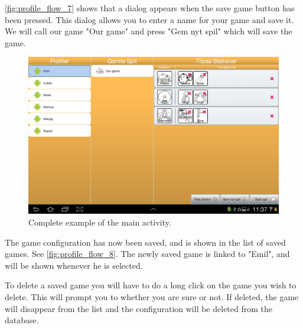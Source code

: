 \autoref{fig:profile_flow_7} shows that a dialog appears when the save game button has been pressed. This dialog allows you to enter a name for your game and save it. We will call our game "Our game" and press "Gem nyt spil" which will save the game.

\begin{figure}[H]
\centering
\includegraphics[width=1.0\linewidth]{img/screenshots/profile_flow_8.jpg}%
\caption{Complete example of the main activity.}
\label{fig:profile_flow_8}
\end{figure}

The game configuration has now been saved, and is shown in the list of saved games. See \autoref{fig:profile_flow_8}. The newly saved game is linked to "Emil", and will be shown whenever he is selected.

To delete a saved game you will have to do a long click on the game you wish to delete. This will prompt you to whether you are sure or not. If deleted, the game will disappear from the list and the configuration will be deleted from the database.
